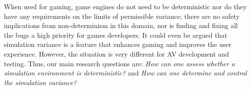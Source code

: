 \documentclass[letterpaper, 10 pt, journal, twoside]{IEEEtran}
\begin{document}
When used for gaming, game engines do not need to be deterministic nor do they have any requirements on the limits of permissible variance; there are no safety implications from non-determinism in this domain, nor is finding and fixing all the bugs %
a high priority for games developers. It could even be argued that simulation variance is a feature that enhances gaming and improves the user experience. However, the situation is very different for AV development and testing. Thus, our main research questions are:
%
%
{\em How can one assess whether a simulation environment is deterministic?} and 
{\em How can one determine and control the simulation variance?}






\end{document}

